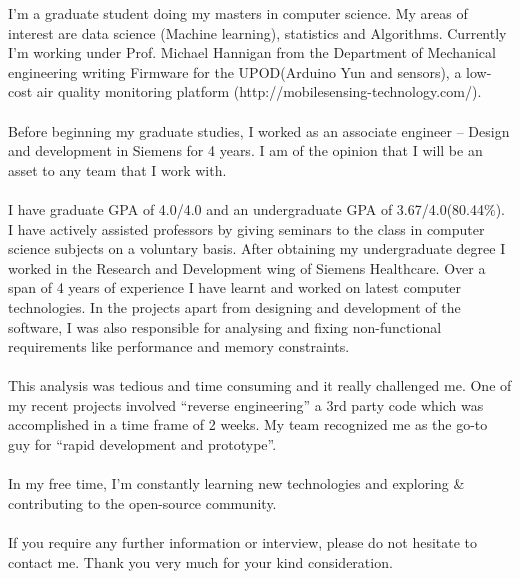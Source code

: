 \documentclass{coverletter}
\begin{document}
\begin{letterheader}

\end{letterheader}

\begin{letter}
\subject{Application for Graduate internship programme at Siemens Medical solutions.}
\begin{content}

I’m a graduate student doing my masters in computer science. My areas of interest are data science (Machine learning), statistics and Algorithms. Currently I’m working under Prof. Michael Hannigan from the Department of Mechanical engineering writing Firmware for the UPOD(Arduino Yun and sensors), a low-cost air quality monitoring platform (http://mobilesensing-technology.com/).\\\\
Before beginning my graduate studies, I worked as an associate engineer – Design and development in Siemens for 4 years. I am of the opinion that I will be an asset to any team that I work with.\\\\
I have graduate GPA of 4.0/4.0 and an undergraduate GPA of 3.67/4.0(80.44\%). I have actively assisted professors by giving seminars to the class in computer science subjects on a voluntary basis. After obtaining my undergraduate degree I worked in the Research and Development wing of Siemens Healthcare. Over a span of 4 years of experience I have learnt and worked on latest computer technologies. In the projects apart from designing and development of the software, I was also responsible for analysing and fixing non-functional requirements like performance and memory constraints.\\\\
This analysis was tedious and time consuming and it really challenged me. One of my recent projects involved “reverse engineering” a 3rd party code which was accomplished in a time frame of 2 weeks. My team recognized me as the go-to guy for “rapid development and prototype”.\\\\
In my free time, I’m constantly learning new technologies and exploring \& contributing to the open-source community.\\\\
If you require any further information or interview, please do not hesitate to contact me. Thank you very much for your kind consideration.

\end{content}
\end{letter}


\begin{contactdetails}
\email{}
\mobilephone{}
\end{contactdetails}
\end{document}
